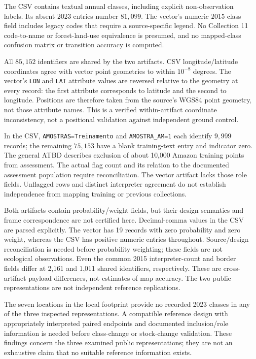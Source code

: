 \documentclass[11pt,a4paper]{article}
\begin{document}
The CSV contains textual annual classes, including explicit non-observation labels. Its absent 2023 entries number $81{,}099$. The vector's numeric 2015 class field includes legacy codes that require a source-specific legend. No Collection 11 code-to-name or forest-land-use equivalence is presumed, and no mapped-class confusion matrix or transition accuracy is computed.

All $85{,}152$ identifiers are shared by the two artifacts. CSV longitude/latitude coordinates agree with vector point geometries to within $10^{-8}$ degrees. The vector's \texttt{LON} and \texttt{LAT} attribute values are reversed relative to the geometry at every record: the first attribute corresponds to latitude and the second to longitude. Positions are therefore taken from the source's WGS84 point geometry, not those attribute names. This is a verified within-artifact coordinate inconsistency, not a positional validation against independent ground control.

In the CSV, \texttt{AMOSTRAS=Treinamento} and \texttt{AMOSTRA\_AM=1} each identify $9{,}999$ records; the remaining $75{,}153$ have a blank training-text entry and indicator zero. The general ATBD describes exclusion of about 10,000 Amazon training points from assessment. The actual flag count and its relation to the documented assessment population require reconciliation. The vector artifact lacks those role fields. Unflagged rows and distinct interpreter agreement do not establish independence from mapping training or previous collections.

Both artifacts contain probability/weight fields, but their design semantics and frame correspondence are not certified here. Decimal-comma values in the CSV are parsed explicitly. The vector has 19 records with zero probability and zero weight, whereas the CSV has positive numeric entries throughout. Source/design reconciliation is needed before probability weighting; these fields are not ecological observations. Even the common 2015 interpreter-count and border fields differ at 2,161 and 1,011 shared identifiers, respectively. These are cross-artifact payload differences, not estimates of map accuracy. The two public representations are not independent reference replications.

The seven locations in the local footprint provide no recorded 2023 classes in any of the three inspected representations. A compatible reference design with appropriately interpreted paired endpoints and documented inclusion/role information is needed before class-change or stock-change validation. These findings concern the three examined public representations; they are not an exhaustive claim that no suitable reference information exists.
\end{document}
